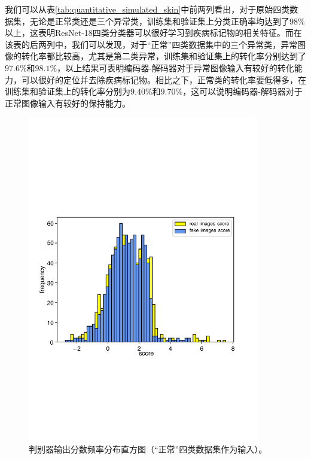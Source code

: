 我们可以从表\ref{tab:quantitative_simulated_skin}中前两列看出，对于原始四类数据集，无论是正常类还是三个异常类，训练集和验证集上分类正确率均达到了$98\%$以上，这表明ResNet-18四类分类器可以很好学习到疾病标记物的相关特征。而在该表的后两列中，我们可以发现，对于“正常”四类数据集中的三个异常类，异常图像的转化率都比较高，尤其是第二类异常，训练集和验证集上的转化率分别达到了$97.6\%$和$98.1\%$，以上结果可表明编码器-解码器对于异常图像输入有较好的转化能力，可以很好的定位并去除疾病标记物。相比之下，正常类的转化率要低得多，在训练集和验证集上的转化率分别为$9.40\%$和$9.70\%$，这可以说明编码器-解码器对于正常图像输入有较好的保持能力。
\begin{figure}[h]
	\centering
	\includegraphics[width=0.9\textwidth]{figure/simulated_skin_score_distribution.pdf}
	\caption[判别器输出分数频率分布直方图（“正常”四类数据集作为输入）]{判别器输出分数频率分布直方图（“正常”四类数据集作为输入）。}
	\label{fig:simulated_skin_hist_freq}
\end{figure}

